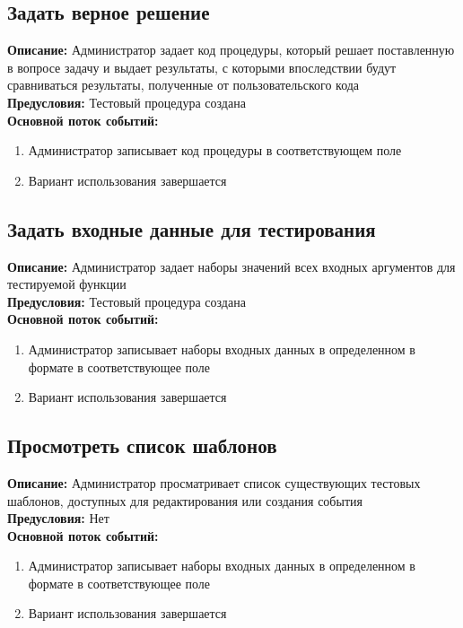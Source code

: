\documentclass{article}
\begin{document}
    \subsection{Задать верное решение}
    \textbf{Описание:} Администратор задает код процедуры, который решает
    поставленную в вопросе задачу и выдает результаты, с которыми впоследствии
    будут сравниваться результаты, полученные от пользовательского кода\\
    \textbf{Предусловия:} Тестовый процедура создана\\
    \textbf{Основной поток событий:}
    \begin{enumerate}
        \item Администратор записывает код процедуры в соответствующем поле
        \item Вариант использования завершается
    \end{enumerate}

    \subsection{Задать входные данные для тестирования}
    \textbf{Описание:} Администратор задает наборы значений всех входных аргументов для тестируемой функции\\
    \textbf{Предусловия:} Тестовый процедура создана\\
    \textbf{Основной поток событий:}
    \begin{enumerate}
        \item Администратор записывает наборы входных данных в определенном в формате в соответствующее поле
        \item Вариант использования завершается
    \end{enumerate}
    
    \subsection{Просмотреть список шаблонов}
    \textbf{Описание:} Администратор просматривает список существующих тестовых
    шаблонов, доступных для редактирования или создания события\\
    \textbf{Предусловия:} Нет\\
    \textbf{Основной поток событий:}
    \begin{enumerate}
        \item Администратор записывает наборы входных данных в определенном в формате в соответствующее поле
        \item Вариант использования завершается
    \end{enumerate}
\end{document}
